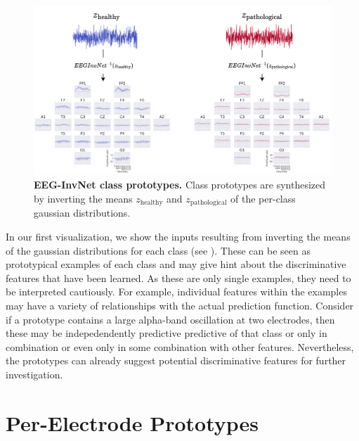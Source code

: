 \begin{figure}[htb]
    \myfloatalign
    \includegraphics[width=1\linewidth]{images/EEGInvNetClassPrototypes.test.png}
    \caption[EEG-InvNet class prototypes]{
\textbf{EEG-InvNet class prototypes.} Class prototypes are synthesized
by inverting the means $z_\mathrm{healthy}$ and
$z_\mathrm{pathological}$ of the per-class gaussian distributions.
}
\label{eeg-prototypes-fig}
\end{figure}

    In our first visualization, we show the inputs resulting from inverting
the means of the gaussian distributions for each class (see
). These can be seen as
prototypical examples of each class and may give hint about the
discriminative features that have been learned. As these are only single
examples, they need to be interpreted cautiously. For example,
individual features within the examples may have a variety of
relationships with the actual prediction function. Consider if a
prototype contains a large alpha-band oscillation at two electrodes,
then these may be indepedendently predictive predictive of that class or
only in combination or even only in some combination with other
features. Nevertheless, the prototypes can already suggest potential
discriminative features for further investigation.

\section{Per-Electrode Prototypes}\label{per-electrode-prototypes}
    

